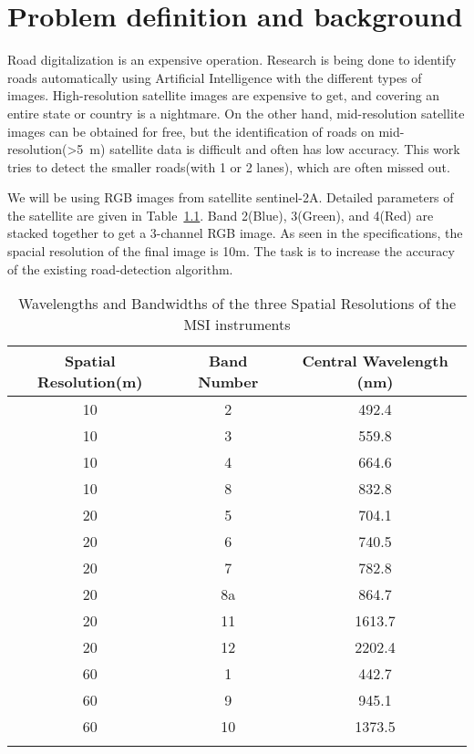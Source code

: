 \chapter{Problem definition and background}\label{chapt:problem}
Road digitalization is an expensive operation. Research is being done to identify roads automatically using Artificial Intelligence with the different types of images. High-resolution satellite images are expensive to get, and covering an entire state or country is a nightmare. On the other hand, mid-resolution satellite images can be obtained for free, but the identification of roads on mid-resolution(>5~m) satellite data is difficult and often has low accuracy. This work tries to detect the smaller roads(with 1 or 2 lanes), which are often missed out. \par

We will be using RGB images from satellite sentinel-2A. Detailed parameters of the satellite are given in Table~\ref{tab:sentinel-resolution}. Band 2(Blue), 3(Green), and 4(Red) are stacked together to get a 3-channel RGB image. As seen in the specifications, the spacial resolution of the final image is 10m. The task is to increase the accuracy of the existing road-detection algorithm. \par

\begin{table}[h!]
  \centering
  \begin{tabular}{ |c|c|c| }
    \hline
    Spatial Resolution(m) & Band Number & Central Wavelength (nm) \\
    \hline
    10&2&492.4 \\
    10&3&559.8 \\
    10&4&664.6 \\
    10&8&832.8 \\
    20&5&704.1 \\
    20&6&740.5 \\
    20&7&782.8 \\
    20&8a&864.7 \\
    20&11&1613.7 \\
    20&12&2202.4 \\
    60&1&442.7 \\
    60&9&945.1 \\
    60&10&1373.5 \\
    \hline\\
  \end{tabular}
  \caption{Wavelengths and Bandwidths of the three Spatial Resolutions of the MSI instruments \cite{sentinelSpecifications}}
  \label{tab:sentinel-resolution}
\end{table}

